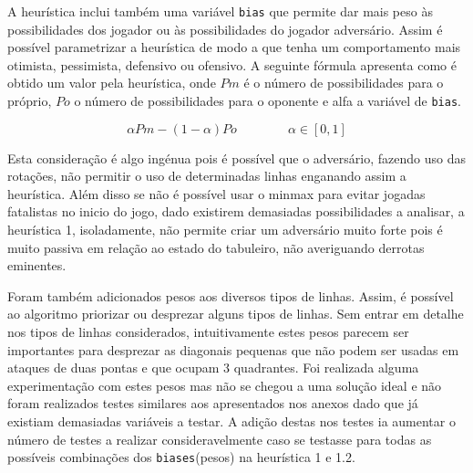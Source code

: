 A heurística inclui também uma variável \verb|bias| que permite dar mais peso às possibilidades dos jogador ou às possibilidades do jogador adversário. Assim é possível parametrizar a heurística de modo a que tenha um comportamento mais otimista, pessimista, defensivo ou ofensivo. A seguinte fórmula apresenta como é obtido um valor pela heurística, onde $Pm$ é o número de possibilidades para o próprio, $Po$ o número de possibilidades para o oponente e alfa a variável de \verb|bias|.

\begin{equation}
\alpha Pm-(1-\alpha)Po  \qquad\qquad\alpha\in[0,1] 
\end{equation}

Esta consideração é algo ingénua pois é possível que o adversário, fazendo uso das rotações, não permitir o uso de determinadas linhas enganando assim a heurística. Além disso se não é possível usar o minmax para evitar jogadas fatalistas no inicio do jogo, dado existirem demasiadas possibilidades a analisar, a heurística 1, isoladamente, não permite criar um adversário muito forte pois é muito passiva em relação ao estado do tabuleiro, não averiguando derrotas eminentes.

Foram também adicionados pesos aos diversos tipos de linhas. Assim, é possível ao algoritmo priorizar ou desprezar alguns tipos de linhas. Sem entrar em detalhe nos tipos de linhas considerados, intuitivamente estes pesos parecem ser importantes para desprezar as diagonais pequenas que não podem ser usadas em ataques de duas pontas e que ocupam 3 quadrantes. Foi realizada alguma experimentação com estes pesos mas não se chegou a uma solução ideal e não foram realizados testes similares aos apresentados nos anexos dado que já existiam demasiadas variáveis a testar. A adição destas nos testes ia aumentar o número de testes a realizar consideravelmente caso se testasse para todas as possíveis combinações dos \verb|biases|(pesos) na heurística 1 e 1.2.

